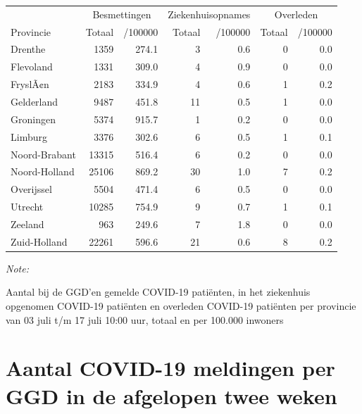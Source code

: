 \documentclass[
  english,
  man,floatsintext]{apa6}
\begin{document}
\begin{table}
\centering
\begin{threeparttable}
\begin{tabular}{lrrrrrr}
\toprule
\multicolumn{1}{c}{ } & \multicolumn{2}{c}{Besmettingen} & \multicolumn{2}{c}{Ziekenhuisopnames} & \multicolumn{2}{c}{Overleden} \\
\cmidrule(l{3pt}r{3pt}){2-3} \cmidrule(l{3pt}r{3pt}){4-5} \cmidrule(l{3pt}r{3pt}){6-7}
Provincie & Totaal & /100000 & Totaal & /100000 & Totaal & /100000\\
\midrule
Drenthe & 1359 & 274.1 & 3 & 0.6 & 0 & 0.0\\
Flevoland & 1331 & 309.0 & 4 & 0.9 & 0 & 0.0\\
FryslÃ¢n & 2183 & 334.9 & 4 & 0.6 & 1 & 0.2\\
Gelderland & 9487 & 451.8 & 11 & 0.5 & 1 & 0.0\\
Groningen & 5374 & 915.7 & 1 & 0.2 & 0 & 0.0\\
Limburg & 3376 & 302.6 & 6 & 0.5 & 1 & 0.1\\
Noord-Brabant & 13315 & 516.4 & 6 & 0.2 & 0 & 0.0\\
Noord-Holland & 25106 & 869.2 & 30 & 1.0 & 7 & 0.2\\
Overijssel & 5504 & 471.4 & 6 & 0.5 & 0 & 0.0\\
Utrecht & 10285 & 754.9 & 9 & 0.7 & 1 & 0.1\\
Zeeland & 963 & 249.6 & 7 & 1.8 & 0 & 0.0\\
Zuid-Holland & 22261 & 596.6 & 21 & 0.6 & 8 & 0.2\\
\bottomrule
\end{tabular}
\begin{tablenotes}
\item \textit{Note: } 
\item Aantal bij de GGD’en gemelde COVID-19 patiënten, in het ziekenhuis opgenomen COVID-19 patiënten en overleden COVID-19 patiënten per provincie van 03 juli t/m 17 juli 10:00 uur, totaal en per 100.000 inwoners
\end{tablenotes}
\end{threeparttable}
\end{table}

\newpage

\hypertarget{aantal-covid-19-meldingen-per-ggd-in-de-afgelopen-twee-weken}{%
\section{Aantal COVID-19 meldingen per GGD in de afgelopen twee weken}\label{aantal-covid-19-meldingen-per-ggd-in-de-afgelopen-twee-weken}}
\end{document}
